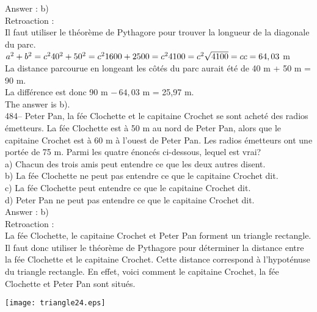 ﻿\documentclass[letterpaper, 12pt]{article}
\begin{document}
Answer : b)\\

Retroaction : \\
Il faut utiliser le th\'eor\`eme de Pythagore pour trouver la longueur de la
diagonale du parc.\\
$a^{2}+b^{2}=c^{2}\\
40^{2}+50^{2}=c^{2}\\
1600+2500=c^{2}\\
4100=c^{2}\\
\sqrt{4100}=c\\
c=64,03$ m\\
La distance parcourue en longeant les c\^ot\'es du parc aurait \'et\'e de 40
m + 50 m = 90 m.\\
La diff\'erence est donc 90 m $-\,64,03$ m = 25,97 m.\\
The answer is b).\\

484-- Peter Pan, la f\'ee Clochette et le capitaine Crochet se sont achet\'e
des radios \'emetteurs.  La f\'ee Clochette est \`a 50 m au nord de Peter
Pan, alors que le capitaine Crochet est \`a 60 m \`a l'ouest de Peter Pan.
Les radios \'emetteurs ont une port\'ee de 75 m.  Parmi les quatre
\'enonc\'es ci-dessous, lequel est vrai?\\
a) Chacun des trois amis peut entendre ce que les deux autres disent.\\
b) La f\'ee Clochette ne peut pas entendre ce que le capitaine Crochet
dit.\\
c) La f\'ee Clochette peut entendre ce que le capitaine Crochet dit.\\
d) Peter Pan ne peut pas entendre ce que le capitaine Crochet dit.\\

Answer : b)\\

Retroaction : \\
La f\'ee Clochette, le capitaine Crochet et Peter Pan forment un triangle
rectangle.  Il faut donc utiliser le th\'eor\`eme de Pythagore pour
d\'eterminer la distance entre la f\'ee Clochette et le capitaine Crochet.
Cette distance correspond \`a l'hypot\'enuse du triangle rectangle.  En
effet, voici comment le capitaine Crochet, la f\'ee Clochette et Peter Pan
sont situ\'es.\\
    \begin{center}
    \texttt{[image: triangle24.eps]}
    \end{center}
\end{document}
